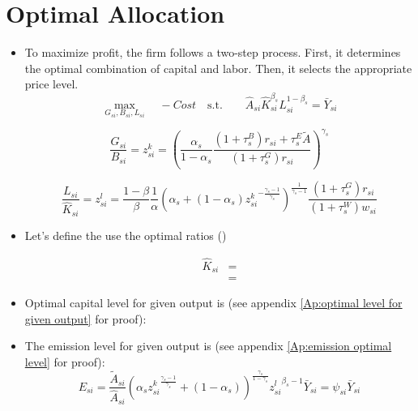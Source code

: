 \documentclass[12pt]{article} %
\begin{document}
\section*{Optimal Allocation}
\begin{itemize}
    \item To maximize profit, the firm follows a two-step process. First, it determines the optimal combination of capital and labor. Then, it selects the appropriate price level.
    \begin{equation*}
        \max_{{G_{si},B_{si},L_{si}}}  \quad
            - 		Cost \quad \text{s.t.} \quad \quad \hat{A}_{si}\hat{K}_{si}^{\beta_s} L_{si}^{1-\beta_s} = \bar{Y}_{si}
    \end{equation*}

    \begin{equation}
        {\frac{G_{si}}{B_{si}} = {z_{si}^k}} {=  \left(
            \frac{\alpha_s}{1-\alpha_s} \frac{(1+{\tau_s^B})r_{si} + {\tau_s^E}\tilde{A}}{(1+{\tau_s^G})r_{si}}
        \right) ^{{\gamma_s}}}
    \end{equation}

    \begin{equation}
        {\frac{L_{si}}{\hat{K}_{si}} = {z_{si}^l}}
        { = \frac{1-\beta}{\beta}\frac{1}{\alpha}\left(\alpha_s  + (1-\alpha_s){z^k_{si}}^{-\frac{\gamma_s-1}{\gamma_s}}\right)^{\frac{1}{\gamma_s-1}} \frac{(1+{\tau_s^G})r_{si}}{(1+{\tau_s^W})w_{si}}}
    \end{equation}
  

    \item Let's define the use the optimal ratios ()
    
    \begin{equation}
        \begin{split}
            \hat{K}_{si} &= \\
            & = 
        \end{split}
        \label{eq:optimal level of K}
    \end{equation}
    \item Optimal capital level for given output is (see appendix \ref{Ap:optimal level for given output} for proof):
    

    \item The emission level for given output is (see appendix \ref{Ap:emission optimal level} for proof):
    \begin{equation}
        {E_{si} = \frac{\tilde{A}_{si}}{\hat{A}_{si}}\left(
            \alpha_s {z^k_{si}}^{\frac{\gamma_s -1}{\gamma_s}} + (1-\alpha_s)
        \right) ^ {\frac{\gamma_s}{1-\gamma_s}} {{z_{si}^l}}^{\beta_s-1} \bar{Y}_{si} }
        {= {\psi_{si}}\bar{Y}_{si}}
    \end{equation}
    

\end{itemize}
\end{document}
